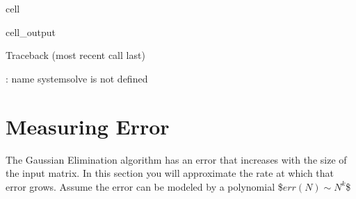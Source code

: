 \documentclass[letterpaper,10pt,english]{jupyterBook}
\begin{document}
\begin{sphinxuseclass}{cell}
\begin{sphinxVerbatimOutput}
\begin{sphinxuseclass}{cell_output}
\begin{sphinxVerbatim}[commandchars=\\\{\}]
Traceback (most recent call last)
 \PYG{p}{[}\PYG{p}{]}  
   
   
 

: name \PYGZsq{}system\PYGZus{}solve\PYGZsq{} is not defined
\end{sphinxVerbatim}

\end{sphinxuseclass}\end{sphinxVerbatimOutput}

\end{sphinxuseclass}

\section{Measuring Error}
\label{\detokenize{lessons/Gaussian_Elimination-student:measuring-error}}
\sphinxAtStartPar
The Gaussian Elimination algorithm has an error that increases with the size of the input matrix. In this section you will approximate the rate at which that error grows. Assume the error can be modeled by a polynomial \$\( err(N) \sim N^k \)\$
\end{document}
